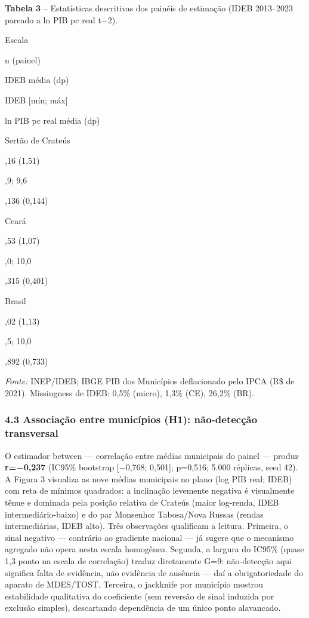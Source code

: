 \documentclass[
  brazilian,
  12pt,
  a4paper,
]{article}
\begin{document}
\textbf{Tabela 3} -- Estatísticas descritivas dos painéis de estimação
(IDEB 2013--2023 pareado a ln PIB pc real t−2).

Escala

n (painel)

IDEB média (dp)

IDEB {{[}mín; máx{]}}

ln PIB pc real média (dp)

Sertão de Crateús

,16 (1,51)

,9; 9,6

,136 (0,144)

Ceará

,53 (1,07)

,0; 10,0

,315 (0,401)

Brasil

,02 (1,13)

,5; 10,0

,892 (0,733)

\emph{Fonte:} INEP/IDEB; IBGE PIB dos Municípios deflacionado pelo IPCA
(R\$ de 2021). Missingness de IDEB: 0,5\% (micro), 1,3\% (CE), 26,2\%
(BR).

\subsubsection{4.3 Associação entre municípios (H1): não-detecção
transversal}\label{associauxe7uxe3o-entre-municuxedpios-h1-nuxe3o-detecuxe7uxe3o-transversal}

O estimador between --- correlação entre médias municipais do painel ---
produz \textbf{r=−0,237} (IC95\% bootstrap {[}−0,768; 0,501{]}; p=0,516;
5.000 réplicas, seed 42). A Figura 3 visualiza as nove médias municipais
no plano (log PIB real; IDEB) com reta de mínimos quadrados: a
inclinação levemente negativa é visualmente tênue e dominada pela
posição relativa de Crateús (maior log-renda, IDEB intermediário-baixo)
e do par Monsenhor Tabosa/Nova Russas (rendas intermediárias, IDEB
alto). Três observações qualificam a leitura. Primeira, o sinal negativo
--- contrário ao gradiente nacional --- já sugere que o mecanismo
agregado não opera nesta escala homogênea. Segunda, a largura do IC95\%
(quase 1,3 ponto na escala de correlação) traduz diretamente G=9:
não-detecção aqui significa falta de evidência, não evidência de
ausência --- daí a obrigatoriedade do aparato de MDES/TOST. Terceira, o
jackknife por município mostrou estabilidade qualitativa do coeficiente
(sem reversão de sinal induzida por exclusão simples), descartando
dependência de um único ponto alavancado.
\end{document}
